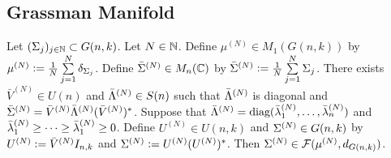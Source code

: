 \documentclass{book}
\begin{document}
	
	
	
	
	
	
	
	
	
	
	
	
	
	
	
	
	
	
	
	
	
	
	
	
	
	
	
	
	
	
	
	\subsection{Grassman Manifold}

	\begin{ex}
		Let $(\Sigma_j)_{j \in \mathbb{N}} \subset G(n,k)$. Let $N \in \mathbb{N}$. Define $\mu^{(N)} \in M_1(G(n,k))$ by $\mu^{(N)} \vcentcolon= \frac{1}{N} \sum\limits_{j =1}^N \delta_{\Sigma_j}$. Define $\bar{\Sigma}^{(N)} \in M_n(\mathbb{C})$ by $\bar{\Sigma}^{(N)} \vcentcolon= \frac{1}{N} \sum\limits_{j=1}^N \Sigma_j$. There exists $\bar{V}^{(N)} \in U(n)$ and $\bar{\Lambda}^{(N)} \in S(n)$ such that $\bar{\Lambda}^{(N)}$ is diagonal and $\bar{\Sigma}^{(N)} = \bar{V}^{(N)} \bar{\Lambda}^{(N)} (\bar{V}^{(N)})^*$. Suppose that $\bar{\Lambda}^{(N)} = \operatorname{\text{diag}}(\bar{\lambda}^{(N)}_1, \ldots, \bar{\lambda}^{(N)}_n)$ and $\bar{\lambda}^{(N)}_1 \geq \cdots \geq \bar{\lambda}^{(N)}_1 \geq 0$. Define $U^{(N)} \in U(n,k)$ and $\Sigma^{(N)} \in G(n,k)$ by $U^{(N)} \vcentcolon= \bar{V}^{(N)} I_{n,k}$ and $\Sigma^{(N)} \vcentcolon= U^{(N)}(U^{(N)})^*$. Then $\Sigma^{(N)} \in \mathcal{F}(\mu^{(N)}, d_{G(n, k)})$. 
	\end{ex}
\end{document}

